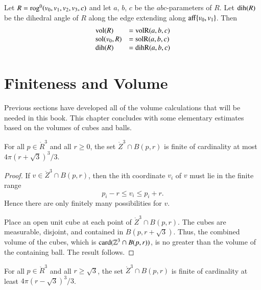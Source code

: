 \begin{lemma}\label{lemma:rog:abc} 
Let $R={\operatorname{rog}}^0(v_0,v_1,v_2,v_3,c)$ and let $a$, $b$,
$c$ be the $abc$-parameters of $R$.  Let ${\operatorname{dih}}(R)$ be the dihedral
angle of $R$ along the edge extending along ${\operatorname{aff}}\{v_0,v_1\}$.  Then
$$
\begin{array}{lll}
{\operatorname{vol}}(R) &= {\operatorname{volR}}(a,b,c)\\
{\operatorname{sol}}(v_0,R) &= {\operatorname{solR}}(a,b,c)\\
{\operatorname{dih}}(R) &= {\operatorname{dihR}}(a,b,c)\\
\end{array}
$$
\end{lemma}

\section{Finiteness and Volume}

Previous sections have developed all of the volume calculations that will
be needed in this book.  This chapter concludes with some 
elementary estimates based on the volumes of  cubes and balls.

\begin{lemma}
    For all $p\in\ring{R}^3$ and all $r\ge 0$, the set
    $\ring{Z}^3\cap B(p,r)$ is finite of cardinality at most
    $4\pi (r+\sqrt3)^3/3$.
\end{lemma}

\begin{proof}  If $v\in\ring{Z}^3\cap B(p,r)$, then the ith
coordinate $v_i$ of $v$ must lie in the finite range
    $$
    p_i - r \le v_i \le p_i + r.
    $$
Hence there are only finitely many possibilities for $v$.


Place an open unit cube at each point of $\ring{Z}^3\cap B(p,r)$.
The cubes are measurable, disjoint, and contained in
$B(p,r+\sqrt3)$.  Thus, the combined volume of the cubes, which is
${\operatorname{card}}(\mathbb{Z}^3\cap B(p,r))$,  is no greater than the volume of the
containing ball.  The result follows.
\end{proof}

\begin{lemma}
  For all $p\in\ring{R}^3$ and all $r\ge\sqrt3$, the set
    $\ring{Z}^3\cap B(p,r)$ is finite of cardinality at least
    $4\pi (r-\sqrt3)^3/3$.
\end{lemma}

